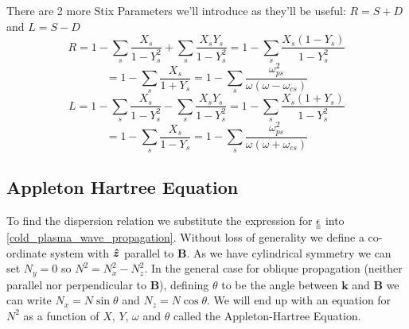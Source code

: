 There are 2 more Stix Parameters we'll introduce as they'll be useful: $R = S + D$ and $L = S - D$
\begin{equation*}
	R = 1 - \sum_s \frac{X_s}{1 - Y_s^2} + \sum_s \frac{X_s Y_s}{1 - Y_s^2} = 1 - \sum_s \frac{X_s \left( 1 - Y_s \right)}{1 - Y_s^2}
\end{equation*}
\begin{equation}
	 = 1 - \sum_s \frac{X_s}{1 + Y_s} = 1 - \sum_s \frac{\omega_{ps}^2}{\omega \left( \omega - \omega_{cs} \right)}
\end{equation}
\begin{equation*}
	L = 1 - \sum_s \frac{X_s}{1 - Y_s^2} - \sum_s \frac{X_s Y_s}{1 - Y_s^2} = 1 - \sum_s \frac{X_s \left( 1 + Y_s \right)}{1 - Y_s^2}
\end{equation*}
\begin{equation}
	 = 1 - \sum_s \frac{X_s}{1 - Y_s} = 1 - \sum_s \frac{\omega_{ps}^2}{\omega \left( \omega + \omega_{cs} \right)}
\end{equation}

\subsection{Appleton Hartree Equation}
To find the dispersion relation we substitute the expression for $\underline{\underline{\epsilon}}$ into \eqref{cold_plasma_wave_propagation}. Without loss of generality we define a co-ordinate system with $\bm{\hat{z}}$ parallel to $\bm{B}$. As we have cylindrical symmetry we can set $N_y = 0$ so $N^2 = N_x^2 - N_z^2$. In the general case for oblique propagation (neither parallel nor perpendicular to $\bm{B}$), defining $\theta$ to be the angle between $\bm{k}$ and $\bm{B}$ we can write $N_x = N \sin \theta$ and $N_z = N \cos \theta$. We will end up with an equation for $N^2$ as a function of $X$, $Y$, $\omega$ and $\theta$ called the Appleton-Hartree Equation.

